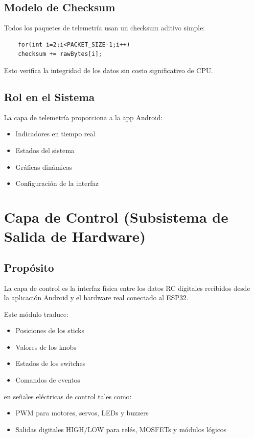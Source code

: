 \documentclass[12pt,a4paper]{article}
\begin{document}
\subsection{Modelo de Checksum}

Todos los paquetes de telemetría usan un checksum aditivo simple:

\begin{lstlisting}
	for(int i=2;i<PACKET_SIZE-1;i++)
	checksum += rawBytes[i];
\end{lstlisting}

Esto verifica la integridad de los datos sin costo significativo de CPU.

\subsection{Rol en el Sistema}

La capa de telemetría proporciona a la app Android:

\begin{itemize}
	\item Indicadores en tiempo real
	\item Estados del sistema
	\item Gráficas dinámicas
	\item Configuración de la interfaz
\end{itemize}


\section{Capa de Control (Subsistema de Salida de Hardware)}

\subsection{Propósito}

La capa de control es la interfaz física entre los datos RC digitales
recibidos desde la aplicación Android y el hardware real
conectado al ESP32.

Este módulo traduce:
\begin{itemize}
	\item Posiciones de los sticks
	\item Valores de los knobs
	\item Estados de los switches
	\item Comandos de eventos
\end{itemize}
en señales eléctricas de control tales como:
\begin{itemize}
	\item PWM para motores, servos, LEDs y buzzers
	\item Salidas digitales HIGH/LOW para relés, MOSFETs y módulos lógicos
\end{itemize}
\end{document}
